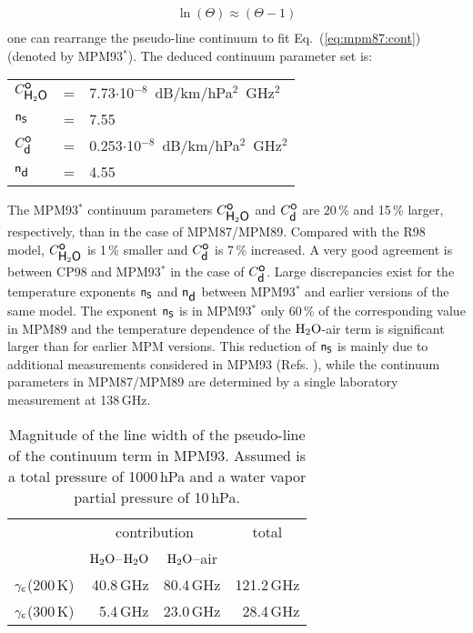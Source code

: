 {\begin{eqnarray}
                 \ln{(\Theta)}\approx(\Theta-1)\\
\nonumber
\end{eqnarray}
one can rearrange the pseudo-line continuum to fit Eq.~(\ref{eq:mpm87:cont})
(denoted by MPM93$^*$). The deduced continuum parameter set is:
\begin{table}
\begin{tabular}{lcl}
 $C^{\mbox{\sf o}}_{\mbox{\sf H}_{2}\mbox{\sf O}}$  & = & 7.73$\cdot$10$^{-8}$~dB/km/hPa$^2$~GHz$^2$\\
 ${\sf n}_{\mbox{\sf s}}$   & = & 7.55\\
 $C^{\mbox{\sf o}}_{\mbox{\sf d}}$  & = & 0.253$\cdot$10$^{-8}$~dB/km/hPa$^2$~GHz$^2$\\ 
 ${\sf n}_{\mbox{\sf d}}$   & = & 4.55 \\
\end{tabular}
\end{table}
The MPM93$^*$ continuum parameters $C^{\mbox{\sf o}}_{\mbox{\sf H}_{2}\mbox{\sf O}}$ and $C^{\mbox{\sf o}}_{\mbox{\sf d}}$ are 20\,\% and 
15\,\% larger, respectively, than in the case of MPM87/MPM89. 
Compared with the R98 model, $C^{\mbox{\sf o}}_{\mbox{\sf H}_{2}\mbox{\sf O}}$ is 1\,\% smaller and
$C^{\mbox{\sf o}}_{\mbox{\sf d}}$ is 7\,\% increased. A very good agreement is between CP98 and
MPM93$^*$ in the case of $C^{\mbox{\sf o}}_{\mbox{\sf d}}$. Large discrepancies exist for the
temperature exponents ${\sf n}_{\mbox{\sf s}}$ and ${\sf n}_{\mbox{\sf d}}$ between MPM93$^*$ and earlier
versions of the same model. The exponent ${\sf n}_{\mbox{\sf s}}$ is in MPM93$^*$ only
60\,\% of the corresponding value in MPM89 and the temperature
dependence of the $\mbox{H}_2\mbox{O}$-air term is significant larger than for
earlier MPM versions. This reduction of ${\sf n}_{\mbox{\sf s}}$ is mainly due to 
additional measurements considered in MPM93 
(Refs. \cite{beckerautler:46,godonetal:92}), while the continuum 
parameters in MPM87/MPM89 are determined by a single laboratory 
measurement at 138\,GHz.
%
\begin{table}[!htb]
\begin{center}
\begin{tabular}{lrrr}
\hline
 & \multicolumn{2}{c}{contribution} & \multicolumn{1}{c}{total} \\
 & \multicolumn{1}{c}{$\mbox{H}_2\mbox{O}$--$\mbox{H}_2\mbox{O}$} & \multicolumn{1}{c}{$\mbox{H}_2\mbox{O}$--air} & \\
\hline
$\gamma_{\sf c}$(200\,K) & 40.8\,GHz & 80.4\,GHz & 121.2\,GHz\\
$\gamma_{\sf c}$(300\,K) &  5.4\,GHz & 23.0\,GHz &  28.4\,GHz\\
\hline
\end{tabular}
\caption{Magnitude of the line width of the pseudo-line of the
  continuum term in MPM93. Assumed is a total pressure of 1000\,hPa
  and a water vapor partial pressure of 10\,hPa.}
\label{tab:mpm_psl_broad}
\end{center}
\end{table} 





}
